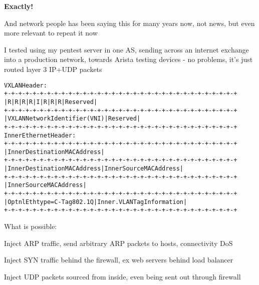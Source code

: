 \documentclass[Screen16to9,17pt,footrule]{foils}
\begin{document}
\vskip 1cm
{\bf\LARGE Exactly!}

\vskip 2cm
And network people has been saying this for many years now, not news, but even more relevant to repeat it now


I tested using my pentest server in one AS, sending across an internet exchange into a production network, towards Arista testing devices - no problems, it's just routed layer 3 IP+UDP packets


\begin{alltt}\footnotesize
VXLAN Header:
+-+-+-+-+-+-+-+-+-+-+-+-+-+-+-+-+-+-+-+-+-+-+-+-+-+-+-+-+-+-+-+-+
|R|R|R|R|I|R|R|R|            Reserved                           |
+-+-+-+-+-+-+-+-+-+-+-+-+-+-+-+-+-+-+-+-+-+-+-+-+-+-+-+-+-+-+-+-+
|                VXLAN Network Identifier (VNI) |   Reserved    |
+-+-+-+-+-+-+-+-+-+-+-+-+-+-+-+-+-+-+-+-+-+-+-+-+-+-+-+-+-+-+-+-+
Inner Ethernet Header:
+-+-+-+-+-+-+-+-+-+-+-+-+-+-+-+-+-+-+-+-+-+-+-+-+-+-+-+-+-+-+-+-+
|             Inner Destination MAC Address                     |
+-+-+-+-+-+-+-+-+-+-+-+-+-+-+-+-+-+-+-+-+-+-+-+-+-+-+-+-+-+-+-+-+
| Inner Destination MAC Address | Inner Source MAC Address      |
+-+-+-+-+-+-+-+-+-+-+-+-+-+-+-+-+-+-+-+-+-+-+-+-+-+-+-+-+-+-+-+-+
|                Inner Source MAC Address                       |
+-+-+-+-+-+-+-+-+-+-+-+-+-+-+-+-+-+-+-+-+-+-+-+-+-+-+-+-+-+-+-+-+
|OptnlEthtype = C-Tag 802.1Q    | Inner.VLAN Tag Information    |
+-+-+-+-+-+-+-+-+-+-+-+-+-+-+-+-+-+-+-+-+-+-+-+-+-+-+-+-+-+-+-+-+
\end{alltt}

What is possible:
\begin{list2}
\item Inject ARP traffic, send arbitrary ARP packets to hosts, connectivity DoS
\item Inject SYN traffic behind the firewall, ex web servers behind load balancer
\item Inject UDP packets sourced from inside, even being sent out through firewall
\end{list2}





\end{document}
